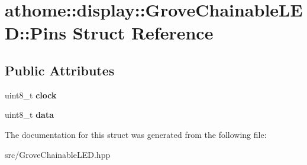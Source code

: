\hypertarget{structathome_1_1display_1_1_grove_chainable_l_e_d_1_1_pins}{}\section{athome\+:\+:display\+:\+:Grove\+Chainable\+L\+ED\+:\+:Pins Struct Reference}
\label{structathome_1_1display_1_1_grove_chainable_l_e_d_1_1_pins}
\subsection*{Public Attributes}
\begin{DoxyCompactItemize}
\item 
\mbox{\label{structathome_1_1display_1_1_grove_chainable_l_e_d_1_1_pins_aeb0cdc4f20d987807ffb35deae4fa322}} 
uint8\+\_\+t {\bfseries clock}
\item 
\mbox{\label{structathome_1_1display_1_1_grove_chainable_l_e_d_1_1_pins_ae8603cd9e402170a5f575a1cc16c5d11}} 
uint8\+\_\+t {\bfseries data}
\end{DoxyCompactItemize}


The documentation for this struct was generated from the following file\+:\begin{DoxyCompactItemize}
\item 
src/Grove\+Chainable\+L\+E\+D.\+hpp\end{DoxyCompactItemize}
